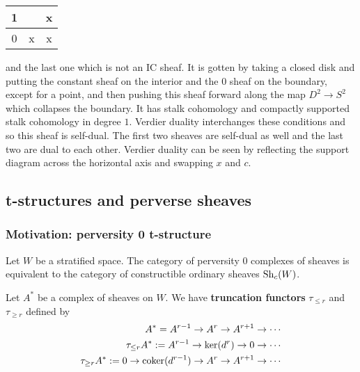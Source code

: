 \documentclass[12pt]{article}
\begin{document}
\begin{example}
\begin{center}
\begin{tabular}{|c|c|c|}
            \hline
            1 &  &  x\\
            \hline
            0 & x & x\\
            \hline
        \end{tabular}
    \end{center}
    and the last one which is not an IC sheaf. It is gotten by taking a closed disk and putting the constant sheaf on the interior
    and the 0 sheaf on the boundary, except for a point, and then pushing 
    this sheaf forward along the map $D^2\to S^2$ which collapses the boundary. It has
    stalk cohomology and compactly supported stalk cohomology in degree $1$. Verdier duality
    interchanges these conditions and so this sheaf is self-dual. The first two sheaves
    are self-dual as well and the last two are dual to each other. Verdier duality can be seen
    by reflecting the support diagram across the horizontal axis and swapping $x$ and $c$.
\end{example}

\subsection{t-structures and perverse sheaves}
\subsubsection{Motivation: perversity 0 t-structure}
Let $W$ be a stratified space. The category of perversity 0 complexes 
of sheaves is equivalent to the category of 
constructible ordinary sheaves $\operatorname{Sh}_c(W)$. 

\begin{definition}
    Let $A^*$ be a complex of sheaves on $W$. 
    We have \textbf{truncation functors} $\tau_{\leq r} $ and $ \tau_{\geq r}$ defined by
    \begin{align*}
        A^* = A^{r-1} \to A^r \to A^{r+1} \to \cdots\\
        \tau_{\leq r}A^* := A^{r-1} \to \ker(d^r) \to 0 \to \cdots\\
        \tau_{\geq r}A^* := 0 \to \operatorname{coker}(d^{r-1}) \to A^r \to A^{r+1} \to \cdots
    \end{align*}
\end{definition}
\end{document}
